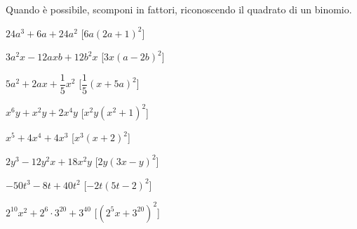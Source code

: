 \begin{esercizio}[\Ast]
\label{ese:div.021}
Quando è possibile, scomponi in fattori, riconoscendo il quadrato di un binomio.
\begin{multicols}{2}
\begin{enumeratea}
 \item $24a^{3}+6a+24a^{2}$ \hfill [$6a(2a+1)^{2}$]
 \item $3a^{2}x-12axb+12b^{2}x$ \hfill [$3x(a-2b)^{2}$]
 \item $5a^{2}+2ax+\dfrac{1}{5}x^{2}$ \hfill [$\dfrac{1}{5}(x+5a)^{2}$]
 \item $x^{6}y+x^{2}y+2x^{4}y$ \hfill [$x^{2}y\left(x^{2}+1\right)^{2}$]
 \item $x^{5}+4x^{4}+4x^{3}$ \hfill [$x^{3}(x+2)^{2}$]
 \item $2y^{3}-12y^{2}x+18x^{2}y$ \hfill [$2y(3x-y)^{2}$]
 \item $-50t^{3}-8t+40t^{2}$ \hfill [$-2t(5t-2)^{2}$]
 \item $2^{10}x^{2}+2^{6}\cdot 3^{20}+3^{40}$ 
  \hfill [$\left(2^{5}x+3^{20}\right)^{2}$]
\end{enumeratea}
\end{multicols}
\end{esercizio}


\paragraph*{}

